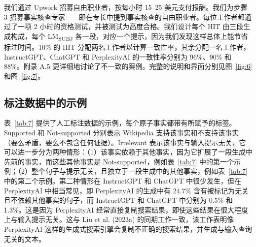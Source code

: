 \documentclass[11pt,UTF8,fontset=fandol]{ctexart}
\newcommand{\subj}{LM\textsubscript{SUBJ}}
\begin{document}
我们通过 Upwork 招募自由职业者，按每小时 15--25 美元支付报酬。我们为步骤 3 招募事实核查专家——即在专长中提到事实核查的自由职业者。每位工作者都通过了一项 2 小时的资格测试，并被测试为高度合格。我们设计每个 HIT 由三段生成构成，每个 \subj{} 各一段，对应一个提示，因为我们发现这样总体上能节省标注时间。10\% 的 HIT 分配两名工作者以计算一致性率，其余分配一名工作者。InstructGPT、ChatGPT 和 PerplexityAI 的一致性率分别为 96\%、90\% 和 88\%。附录 A.5 更详细地讨论了不一致的案例。完整的说明和界面分别见图~\ref{fig:6} 和图~\ref{fig:7}。

\subsection{标注数据中的示例}

表~\ref{tab:7} 提供了人工标注数据的示例，每个原子事实都带有所赋予的标签。Supported 和 Not-supported 分别表示 Wikipedia 支持该事实和不支持该事实（要么矛盾，要么不包含任何证据）。Irrelevant 表示该事实与输入提示无关，它可以进一步分为两种情形：（1）该事实依赖于其他事实，因为它扩展了一段生成中先前的事实，而这些其他事实是 Not-supported，例如表~\ref{tab:7} 中的第一个示例；（2）整个句子与提示无关，且独立于一段生成中的其他事实，例如表~\ref{tab:7} 中的第二个示例。第二种情形在 InstructGPT 和 ChatGPT 中很少发生，但在 PerplexityAI 中相当常见，即 PerplexityAI 的生成中有 24.7\% 含有被标记为无关且不依赖其他事实的句子，而 InstructGPT 和 ChatGPT 中分别为 0.5\% 和 1.3\%。这是因为 PerplexityAI 经常直接复制搜索结果，即使这些结果在很大程度上与输入提示无关。这与 Liu et al. (2023a) 的同期工作一致，该工作表明像 PerplexityAI 这样的生成式搜索引擎会复制不正确的搜索结果，并生成与输入查询无关的文本。
\end{document}

